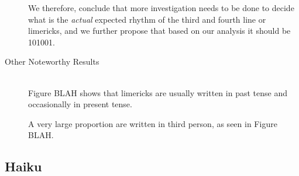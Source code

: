 \begin{description}
We therefore, conclude that more investigation needs to be done to decide what is the \textit{actual} expected rhythm of the third and fourth line or limericks, and we further propose that based on our analysis it should be 101001.

\item[Other Noteworthy Results]  \hfill \\
Figure BLAH shows that limericks are usually written in past tense and occasionally in present tense.

A very large proportion are written in third person, as seen in Figure BLAH.

\end{description}


\subsection{Haiku}

